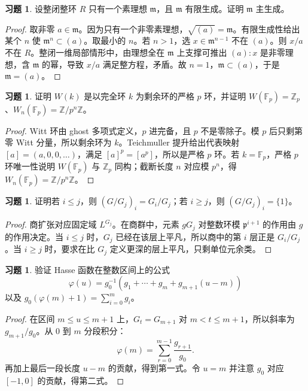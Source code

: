 \documentclass[11pt,a4paper,openany]{ctexbook}
\numberwithin{equation}{chapter}
\newcommand{\Z}{\mathbb{Z}}
\newcommand{\F}{\mathbb{F}}
\theoremstyle{plain}
\theoremstyle{definition}
\newtheorem{exercise}[theorem]{习题}
\theoremstyle{remark}
\begin{document}
\begin{exercise}
设整闭整环 $R$ 只有一个素理想 $\mathfrak m$，且 $\mathfrak m$ 有限生成。证明 $\mathfrak m$ 主生成。
\end{exercise}

\begin{proof}
取非零 $a\in\mathfrak m$。因为只有一个非零素理想，$\sqrt{(a)}=\mathfrak m$。有限生成性给出某个 $n$ 使 $\mathfrak m^n\subset(a)$。取最小的 $n$。若 $n>1$，选 $x\in\mathfrak m^{n-1}$ 不在 $(a)$。则 $x/a$ 不在 $R$。整闭一维局部情形中，由理想全在 $\mathfrak m$ 上支撑可推出 $(a):x$ 是非零理想，含 $\mathfrak m$ 的幂，导致 $x/a$ 满足整方程，矛盾。故 $n=1$，$\mathfrak m\subset(a)$，于是 $\mathfrak m=(a)$。
\end{proof}

\begin{exercise}
证明 $W(k)$ 是以完全环 $k$ 为剩余环的严格 $p$ 环，并证明 $W(\F_p)=\Z_p$、$W_n(\F_p)=\Z/p^n\Z$。
\end{exercise}

\begin{proof}
Witt 环由 ghost 多项式定义，$p$ 进完备，且 $p$ 不是零除子。模 $p$ 后只剩第零 Witt 分量，所以剩余环为 $k$。Teichmuller 提升给出代表映射 $[a]=(a,0,0,\ldots)$，满足 $[a]^p=[a^p]$，所以是严格 $p$ 环。若 $k=\F_p$，严格 $p$ 环唯一性说明 $W(\F_p)$ 与 $\Z_p$ 同构；截断长度 $n$ 对应模 $p^n$，得 $W_n(\F_p)=\Z/p^n\Z$。
\end{proof}

\begin{exercise}
证明若 $i\le j$，则 $(G/G_j)_i=G_i/G_j$；若 $i\ge j$，则 $(G/G_j)_i=\{1\}$。
\end{exercise}

\begin{proof}
商扩张对应固定域 $L^{G_j}$。在商群中，元素 $gG_j$ 对整数环模 $\mathfrak p^{i+1}$ 的作用由 $g$ 的作用决定。当 $i\le j$ 时，$G_j$ 已经在该层上平凡，所以商中的第 $i$ 层正是 $G_i/G_j$。当 $i\ge j$ 时，要求在比 $G_j$ 定义更深的层上平凡，只剩单位元余类。
\end{proof}

\begin{exercise}
验证 Hasse 函数在整数区间上的公式
\[
  \varphi(u)=g_0^{-1}(g_1+\cdots+g_m+g_{m+1}(u-m))
\]
以及 $g_0(\varphi(m)+1)=\sum_{i=0}^m g_i$。
\end{exercise}

\begin{proof}
在区间 $m\le u\le m+1$ 上，$G_t=G_{m+1}$ 对 $m<t\le m+1$，所以斜率为 $g_{m+1}/g_0$。从 $0$ 到 $m$ 分段积分：
\[
  \varphi(m)=\sum_{r=0}^{m-1}\frac{g_{r+1}}{g_0}.
\]
再加上最后一段长度 $u-m$ 的贡献，得到第一式。令 $u=m$ 并注意 $g_0$ 对应 $[-1,0]$ 的贡献，得第二式。
\end{proof}
\end{document}
